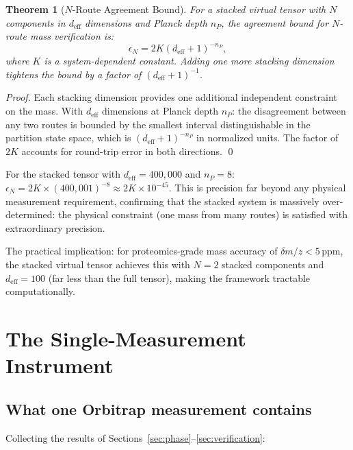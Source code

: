 \documentclass[twocolumn,10pt,a4paper]{article}
\theoremstyle{thmstyle}
\newtheorem{theorem}{Theorem}[section]
\theoremstyle{definition}
\theoremstyle{remark}
\begin{document}
\begin{theorem}[$N$-Route Agreement Bound]
\label{thm:nroute}
For a stacked virtual tensor with $N$ components in $d_{\text{eff}}$
dimensions and Planck depth $n_P$, the agreement bound for
$N$-route mass verification is:
\begin{equation}
\epsilon_N = 2K(d_{\text{eff}} + 1)^{-n_P},
\label{eq:agreement}
\end{equation}
where $K$ is a system-dependent constant. Adding one more stacking
dimension tightens the bound by a factor of $(d_{\text{eff}} + 1)^{-1}$.
\end{theorem}

\begin{proof}
Each stacking dimension provides one additional independent constraint
on the mass. With $d_{\text{eff}}$ dimensions at Planck depth $n_P$:
the disagreement between any two routes is bounded by the smallest
interval distinguishable in the partition state space, which is
$(d_{\text{eff}} + 1)^{-n_P}$ in normalized units. The factor of $2K$
accounts for round-trip error in both directions. \qed
\end{proof}

For the stacked tensor with $d_{\text{eff}} = 400{,}000$ and $n_P = 8$:
$\epsilon_N = 2K \times (400{,}001)^{-8} \approx 2K \times 10^{-45}$.
This is precision far beyond any physical measurement requirement,
confirming that the stacked system is massively over-determined:
the physical constraint (one mass from many routes) is satisfied with
extraordinary precision.

The practical implication: for proteomics-grade mass accuracy of
$\delta m/z < 5\,\mathrm{ppm}$, the stacked virtual tensor achieves
this with $N = 2$ stacked components and $d_{\text{eff}} = 100$
(far less than the full tensor), making the framework tractable
computationally.

\section{The Single-Measurement Instrument}
\label{sec:instrument}

\subsection{What one Orbitrap measurement contains}

Collecting the results of Sections~\ref{sec:phase}--\ref{sec:verification}:
\end{document}
